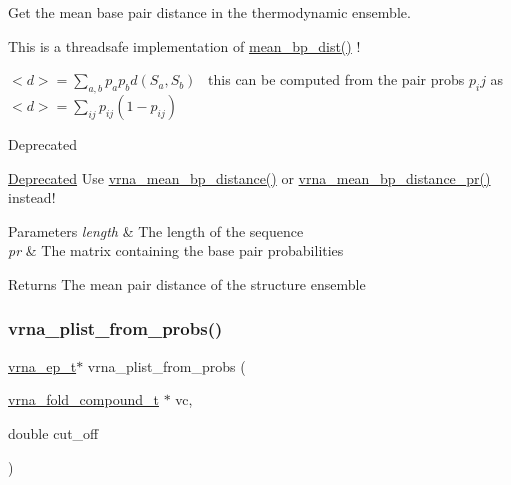 Get the mean base pair distance in the thermodynamic ensemble. 

This is a threadsafe implementation of \hyperlink{part__func_8h_ae9556ba7ded44fe2321b6f67c3fc02a3}{mean\+\_\+bp\+\_\+dist()} !

$<d> = \sum_{a,b} p_a p_b d(S_a,S_b)$~\newline
this can be computed from the pair probs $p_ij$ as~\newline
 $<d> = \sum_{ij} p_{ij}(1-p_{ij})$

\begin{DoxyRefDesc}{Deprecated}
\item[\hyperlink{deprecated__deprecated000110}{Deprecated}]Use \hyperlink{group__pf__fold_gaa6b8983b559b9ef4b2e1b31113ea317b}{vrna\+\_\+mean\+\_\+bp\+\_\+distance()} or \hyperlink{group__pf__fold_gad3f0c240512e6d43e2e4d4c2076021f5}{vrna\+\_\+mean\+\_\+bp\+\_\+distance\+\_\+pr()} instead!\end{DoxyRefDesc}



\begin{DoxyParams}{Parameters}
{\em length} & The length of the sequence \\
\hline
{\em pr} & The matrix containing the base pair probabilities \\
\hline
\end{DoxyParams}
\begin{DoxyReturn}{Returns}
The mean pair distance of the structure ensemble 
\end{DoxyReturn}
\mbox{\label{group__pf__fold_ga94f6efc0b8d8712b023452794a0a5bd2}} 
\subsubsection{\texorpdfstring{vrna\+\_\+plist\+\_\+from\+\_\+probs()}{vrna\_plist\_from\_probs()}}
{\footnotesize\ttfamily \hyperlink{group__struct__utils_gab9ac98ab55ded9fb90043b024b915aca}{vrna\+\_\+ep\+\_\+t}$\ast$ vrna\+\_\+plist\+\_\+from\+\_\+probs (\begin{DoxyParamCaption}\item[{\hyperlink{group__fold__compound_ga1b0cef17fd40466cef5968eaeeff6166}{vrna\+\_\+fold\+\_\+compound\+\_\+t} $\ast$}]{vc,  }\item[{double}]{cut\+\_\+off }\end{DoxyParamCaption})}



